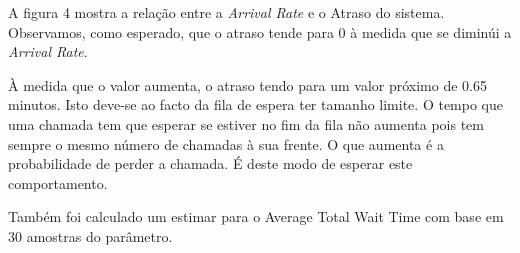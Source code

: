 A figura 4 mostra a relação entre a \textit{Arrival Rate} e o Atraso do sistema.
Observamos, como esperado, que o atraso tende para 0 à medida que se diminúi a \textit{Arrival Rate}.

À medida que o valor aumenta, o atraso tendo para um valor próximo de 0.65 minutos.
Isto deve-se ao facto da fila de espera ter tamanho limite.
O tempo que uma chamada tem que esperar se estiver no fim da fila não aumenta pois tem sempre o mesmo número de chamadas à sua frente.
O que aumenta é a probabilidade de perder a chamada. É deste modo de esperar este comportamento.

Também foi calculado um estimar para o Average Total Wait Time com base em 30 amostras do parâmetro.

